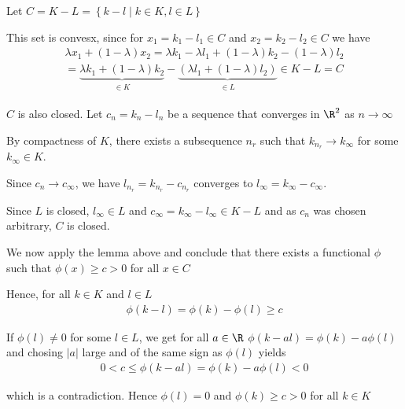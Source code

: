 \begin{prf}{}
Let $C=K-L = \left\{k-l\mid k\in K, l\in L\right\}$\par
\noindent This set is convesx, since for $x_1 = k_1-l_1\in C$ and $x_2 = k_2-l_2\in C$ we have
\begin{equation*}
  \begin{gathered}
    \lambda x_1 + (1-\lambda)x_2 = \lambda k_1-\lambda l_1+(1-\lambda)k_2-(1-\lambda)l_2\\
    = \underbrace{\lambda k_1+(1-\lambda)k_2}_{\substack{\in K}}-\underbrace{\left(\lambda l_1+(1-\lambda)l_2\right)}_{\substack{\in L}}\in K-L=C
  \end{gathered}
\end{equation*}
\par\bigskip
\noindent $C$ is also closed. Let $c_n = k_n-l_n$ be a sequence that converges in $\R^2$ as $n\to\infty$\par
\noindent By compactness of $K$, there exists a subsequence $n_r$ such that $k_{n_r}\to k_\infty$ for some $k_\infty\in K$.\par
\noindent Since $c_n\to c_\infty$, we have $l_{n_r} = k_{n_r}-c_{n_r}$ converges to $l_\infty=k_\infty-c_\infty$.\par
\noindent Since $L$ is closed, $l_\infty\in L$ and $c_\infty=k_\infty-l_\infty\in K-L$ and as $c_n$ was chosen arbitrary, $C$ is closed.
\par\bigskip
\noindent We now apply the lemma above and conclude that there exists a functional $\phi$ such that $\phi(x)\geq c>0$ for all $x\in C$\par
\noindent Hence, for all $k\in K$ and $l\in L$
\begin{equation*}
  \begin{gathered}
    \phi(k-l) = \phi(k)-\phi(l)\geq c
  \end{gathered}
\end{equation*}\par
\noindent If $\phi(l)\neq0$ for some $l\in L$, we get for all $a\in \R$ $\phi(k-al)=\phi(k)-a\phi(l)$ and chosing $\left|a\right|$ large and of the same sign as $\phi(l)$ yields
\begin{equation*}
  \begin{gathered}
    0<c\leq \phi(k-al) = \phi(k)-a\phi(l)<0
  \end{gathered}
\end{equation*}\par
\noindent which is a contradiction. Hence $\phi(l) = 0$ and $\phi(k)\geq c>0$ for all $k\in K$
\end{prf}
\par\bigskip
